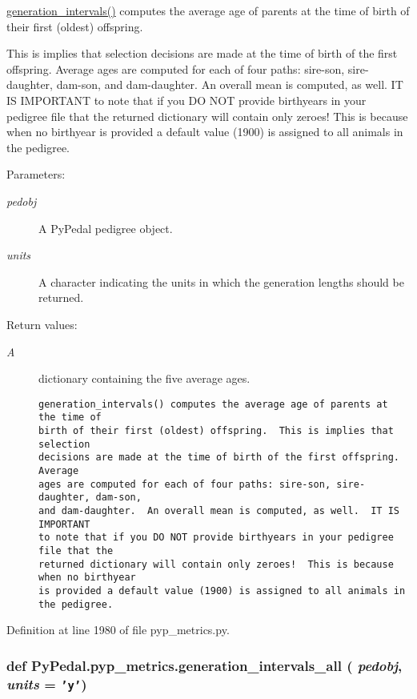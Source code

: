 \hyperlink{namespacePyPedal_1_1pyp__metrics_4fc7310e1c6484240ec0571a654cc64a}{generation\_\-intervals()} computes the average age of parents at the time of birth of their first (oldest) offspring. 

This is implies that selection decisions are made at the time of birth of the first offspring. Average ages are computed for each of four paths: sire-son, sire-daughter, dam-son, and dam-daughter. An overall mean is computed, as well. IT IS IMPORTANT to note that if you DO NOT provide birthyears in your pedigree file that the returned dictionary will contain only zeroes! This is because when no birthyear is provided a default value (1900) is assigned to all animals in the pedigree. \begin{Desc}
\item[Parameters:]
\begin{description}
\item[{\em pedobj}]A Py\-Pedal pedigree object. \item[{\em units}]A character indicating the units in which the generation lengths should be returned. \end{description}
\end{Desc}
\begin{Desc}
\item[Return values:]
\begin{description}
\item[{\em A}]dictionary containing the five average ages.

\footnotesize\begin{verbatim}generation_intervals() computes the average age of parents at the time of
birth of their first (oldest) offspring.  This is implies that selection
decisions are made at the time of birth of the first offspring.  Average
ages are computed for each of four paths: sire-son, sire-daughter, dam-son,
and dam-daughter.  An overall mean is computed, as well.  IT IS IMPORTANT
to note that if you DO NOT provide birthyears in your pedigree file that the
returned dictionary will contain only zeroes!  This is because when no birthyear
is provided a default value (1900) is assigned to all animals in the pedigree.
\end{verbatim}
\normalsize
 \end{description}
\end{Desc}


Definition at line 1980 of file pyp\_\-metrics.py.\hypertarget{namespacePyPedal_1_1pyp__metrics_553d55d2e917b00baf2f02a7cceacd70}{
\subsubsection[generation\_\-intervals\_\-all]{\setlength{\rightskip}{0pt plus 5cm}def Py\-Pedal.pyp\_\-metrics.generation\_\-intervals\_\-all ( {\em pedobj},  {\em units} = {\tt 'y'})}}
\label{namespacePyPedal_1_1pyp__metrics_553d55d2e917b00baf2f02a7cceacd70}


